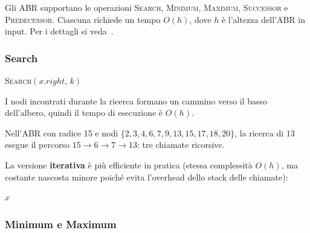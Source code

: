 \begin{softnote}
	Gli ABR supportano le operazioni \textsc{Search}, \textsc{Minimum}, \textsc{Maximum},
	\textsc{Successor} e \textsc{Predecessor}. Ciascuna richiede un tempo $O(h)$, dove $h$
	è l'altezza dell'ABR in input. Per i dettagli si veda~\cite{CLRS}.
\end{softnote}

\subsubsection{Search}
\label{subsub:search}

\begin{algorithm}[H]
	\caption{\textsc{Search}$(x,\, k)$}
	\Return \textsc{Search}$(x.\mathit{right},\, k)$\;
\end{algorithm}

I nodi incontrati durante la ricerca formano un cammino verso il basso dell'albero,
quindi il tempo di esecuzione è $O(h)$.

\begin{esempio}
	Nell'ABR con radice 15 e nodi $\{2,3,4,6,7,9,13,15,17,18,20\}$,
	la ricerca di 13 esegue il percorso $15 \to 6 \to 7 \to 13$: tre chiamate ricorsive.
\end{esempio}

La versione \textbf{iterativa} è più efficiente in pratica (stessa complessità $O(h)$,
ma costante nascosta minore poiché evita l'overhead dello stack delle chiamate):

\begin{algorithm}[H]
	\caption{\textsc{IterSearch}$(x,\, k)$}
	\Return $x$\;
\end{algorithm}

\subsubsection{Minimum e Maximum}
\label{subsub:minmax}

